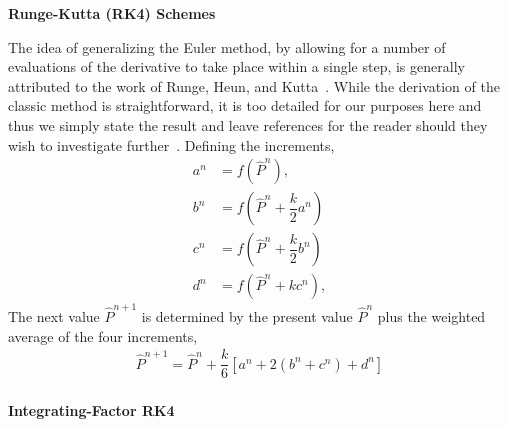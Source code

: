 \documentclass[11pt]{article}
\newcommand{\Phat}{\hat{P}}
\begin{document}
\noindent\textbf{Runge-Kutta (RK4) Schemes}

The idea of generalizing the Euler method, by allowing for a number of evaluations of the derivative to take place within a single step, is generally attributed to the work of Runge, Heun, and Kutta~\cite{boyd2013chebyshev}. While the derivation of the classic method is straightforward, it is too detailed for our purposes here and thus we simply state the result and leave references for the reader should they wish to investigate further~\cite{butcher2008numerical}. %
Defining the increments,
\begin{subequations}
    \begin{align}
        a^{n} &= f\left(\Phat^{n}\right),\\
        b^{n} &= f\left(\Phat^{n}+\dfrac{k}{2}a^{n}\right)\\
        c^{n} &= f\left(\Phat^{n}+\dfrac{k}{2}b^{n}\right)\\
        d^{n} &= f\left(\Phat^{n}+kc^{n}\right),
    \end{align}
\end{subequations}
The next value $\Phat^{n+1}$ is determined by the present value $\Phat^{n}$ plus the weighted average of the four increments,
\begin{align}
    \Phat^{n+1} = \Phat^{n} + \dfrac{k}{6}\left[a^{n} + 2\left(b^{n}+c^{n}\right) + d^{n}\right]\label{eq:rk4_scheme}
\end{align}\\

\noindent\textbf{Integrating-Factor RK4}
\end{document}
